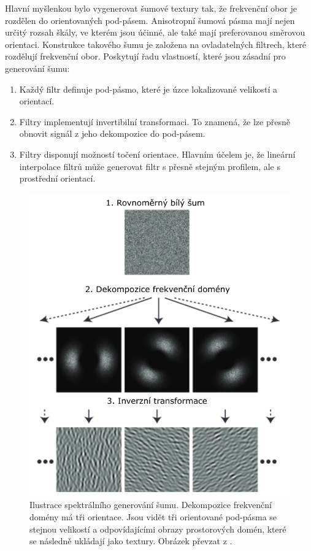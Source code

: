 Hlavní myšlenkou bylo vygenerovat šumové textury tak, že frekvenční obor je rozdělen do orientovaných pod-pásem. Anisotropní šumová pásma mají nejen určitý rozsah škály, ve kterém jsou účinné, ale také mají preferovanou směrovou orientaci. Konstrukce takového šumu je založena na ovladatelných filtrech, které rozdělují frekvenční obor. Poskytují řadu vlastností, které jsou zásadní pro generování šumu:
\begin{enumerate}
	\item Každý filtr definuje pod-pásmo, které je úzce lokalizované velikostí a orientací.
	\item Filtry implementují invertibilní transformaci. To znamená, že lze přesně obnovit signál z jeho dekompozice do pod-pásem.
	\item Filtry disponují možností točení orientace. Hlavním účelem je, že lineární interpolace filtrů může generovat filtr s přesně stejným profilem, ale s prostřední orientací.
\end{enumerate}

\begin{figure}[H]
	\centering
	\includegraphics[scale=1]{obrazky-figures/AnisotropicNoise.pdf}
	\caption{Ilustrace spektrálního generování šumu. Dekompozice frekvenční domény má tři orientace. Jsou vidět tři orientované pod-pásma se stejnou velikostí a odpovídajícími obrazy prostorových domén, které se následně ukládají jako textury. Obrázek převzat z \cite{Goldberg08}.}
	\label{fig:AnisotropicNoise}
\end{figure}

